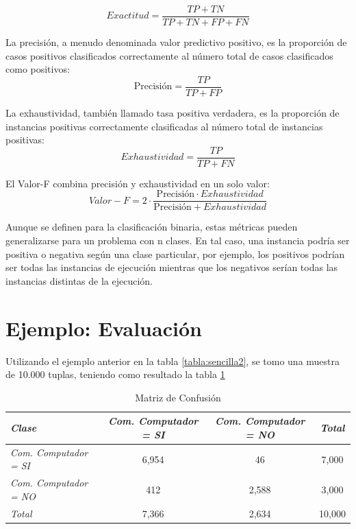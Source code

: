\begin{equation}
Exactitud = \frac{TP + TN}{TP + TN + FP + FN}
\end{equation}

La precisión, a menudo denominada valor predictivo positivo, es la proporción de casos positivos clasificados correctamente al número total de casos clasificados como positivos:
\begin{equation}
\mbox{Precisión} = \frac{TP}{TP + FP}
\end{equation}

La exhaustividad, también llamado tasa positiva verdadera, es la proporción de instancias positivas correctamente clasificadas al número total de instancias positivas:
\begin{equation}
Exhaustividad = \frac{TP}{TP + FN}
\end{equation}


El Valor-F combina precisión y exhaustividad en un solo valor:
\begin{equation}
Valor-F = 2 \cdot \frac{\mbox{Precisión} \cdot Exhaustividad}{\mbox{Precisión} + Exhaustividad}
\end{equation}

Aunque se definen para la clasificación binaria, estas métricas pueden generalizarse para un problema con n clases. En tal caso, una instancia podría ser positiva o negativa según una clase particular, por ejemplo, los positivos podrían ser todas las instancias de ejecución mientras que los negativos serían todas las instancias distintas de la ejecución.

\section{Ejemplo: Evaluación}

Utilizando el ejemplo anterior en la tabla \ref{tabla:sencilla2}, se tomo una muestra de 10.000 tuplas, teniendo como resultado la tabla \ref{tabla:MatrizConfusion}


\begin{table}[htbp]
	\caption{Matriz de Confusión}
	\label{tabla:MatrizConfusion}
	\begin{tabular}{|l|c|c|c|}
		\hline 
		\textit{Clase} & \textit{Com. Computador = SI}    &\textit{Com. Computador = NO} & \textit{Total}  \\
		\hline 
		\textit{Com. Computador = SI}	& 6,954   	& 46    	& 7,000     \\ 
		\textit{Com. Computador = NO}	& 412		& 2,588		& 3,000    	\\ 
		\hline
		\textit{Total}					& 7,366		& 2,634    	& 10,000	\\ 
		\hline
	\end{tabular}
\end{table}


